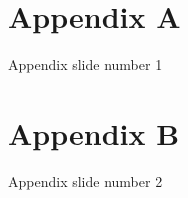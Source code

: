 \section*{Appendix A}

\begin{frame}{Appendix slide number 1}
    \lipsum[1]
\end{frame}

\section*{Appendix B}

\begin{frame}{Appendix slide number 2}
    \lipsum[2]
\end{frame}